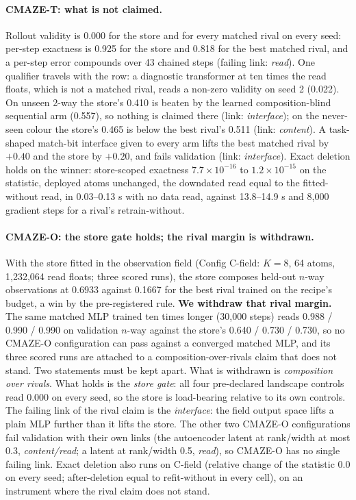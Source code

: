 \documentclass{article} %
\newcommand{\sci}[2]{\ensuremath{#1\times10^{#2}}}
\begin{document}
\paragraph{CMAZE-T: what is not claimed.} Rollout validity is 0.000 for the store and for every
matched rival on every seed: per-step exactness is 0.925 for the store and 0.818 for the best
matched rival, and a per-step error compounds over 43 chained steps (failing link: \emph{read}). One
qualifier travels with the row: a diagnostic transformer at ten times the read floats, which is not
a matched rival, reads a non-zero validity on seed 2 (0.022). On unseen 2-way the store's 0.410 is
beaten by the learned composition-blind sequential arm (0.557), so nothing is claimed there (link:
\emph{interface}); on the never-seen colour the store's 0.465 is below the best rival's 0.511 (link:
\emph{content}). A task-shaped match-bit interface given to every arm lifts the best matched rival by
$+0.40$ and the store by $+0.20$, and fails validation (link: \emph{interface}). Exact deletion holds
on the winner: store-scoped exactness \sci{7.7}{-16} to \sci{1.2}{-15} on the statistic, deployed
atoms unchanged, the downdated read equal to the fitted-without read, in 0.03--0.13 s with no data
read, against 13.8--14.9 s and 8,000 gradient steps for a rival's retrain-without.

\paragraph{CMAZE-O: the store gate holds; the rival margin is withdrawn.} With the store fitted in
the observation field (Config C-field: $K=8$, 64 atoms, 1,232,064 read floats; three scored runs), the store
composes held-out $n$-way observations at 0.6933 against 0.1667 for the best rival trained on the
recipe's budget, a win by the pre-registered rule. \textbf{We withdraw that rival
margin.} The same matched MLP trained ten times longer (30,000 steps) reads 0.988 / 0.990 / 0.990 on
validation $n$-way against the store's 0.640 / 0.730 / 0.730, so no CMAZE-O configuration can pass
against a converged matched MLP, and its three scored runs are attached to a composition-over-rivals claim that
does not stand. Two statements must be kept apart. What is withdrawn is \emph{composition over
rivals}. What holds is the \emph{store gate}: all four pre-declared landscape controls read 0.000 on every seed,
so the store is load-bearing relative to its own controls. The failing link of the rival claim is
the \emph{interface}: the field output space lifts a plain MLP further than it lifts the store. The
other two CMAZE-O configurations fail validation with their own links (the autoencoder latent at
rank/width at most 0.3, \emph{content/read}; a latent at rank/width 0.5, \emph{read}), so CMAZE-O has
no single failing link. Exact deletion also runs on C-field (relative change of the statistic 0.0 on
every seed; after-deletion equal to refit-without in every cell), on an instrument where the rival
claim does not stand.
\end{document}
